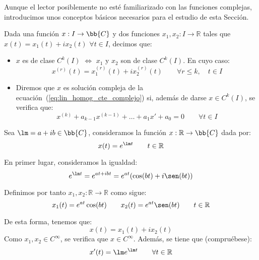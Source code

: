 Aunque el lector posiblemente no esté familiarizado con las funciones complejas, introducimos unos conceptos básicos necesarios para el estudio de esta Sección.
\begin{definicion}
    Dada una función $x:I\rightarrow\bb{C}$ y dos funciones $x_1,x_2:I\rightarrow\mathbb{R}$ tales que $x(t) = x_1(t) + ix_2(t)$ $\forall t\in I$, decimos que:
    \begin{itemize}
        \item $x$ es de clase $C^k(I)$ $\Longleftrightarrow $ $x_1$ y $x_2$ son de clase $C^k(I)$. En cuyo caso:
            \begin{equation*}
                x^{(r)}(t) = x_1^{(r)}(t) + ix_2^{(r)}(t) \qquad \forall r\leq k, \quad t\in I
            \end{equation*}
        \item Diremos que $x$ es solución compleja de la ecuación~(\ref{eq:lin_homog_cte_complejo}) si, además de darse $x\in C^k(I)$, se verifica que:
            \begin{equation*}
                x^{(k)} + a_{k-1}x^{(k-1)} + \ldots + a_1 x' + a_0 = 0 \qquad \forall t\in I
            \end{equation*}
    \end{itemize}
\end{definicion}

\begin{ejemplo}
    Sea $\lm = a+ib\in \bb{C}$, consideramos la función $x:\mathbb{R}\rightarrow\bb{C}$ dada por:
    \begin{equation*}
        x(t) = e^{\lm t} \qquad t\in \mathbb{R}
    \end{equation*}

    En primer lugar, consideramos la igualdad:
    \begin{equation*}
        e^{\lm t} = e^{at + ibt} = e^{at}(\cos (bt) + i\sen (bt))
    \end{equation*}

    Definimos por tanto $x_1,x_2:\mathbb{R}\rightarrow\mathbb{R}$ como sigue:
    \begin{equation*}
        x_1(t) = e^{at} \cos(bt) \qquad x_2(t) = e^{at} \sen(bt) \qquad t\in \mathbb{R}
    \end{equation*}

    De esta forma, tenemos que:
    \begin{equation*}
        x(t) = x_1(t) + ix_2(t)
    \end{equation*}
    Como $x_1,x_2\in C^\infty$, se verifica que $x\in C^\infty$. Además, se tiene que (compruébese):
    \begin{equation*}
        x'(t) = \lm e^{\lm t} \qquad \forall t\in \mathbb{R}
    \end{equation*}
\end{ejemplo}

